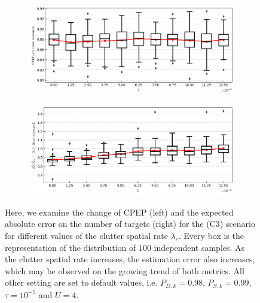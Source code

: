 \begin{figure}
    \centering
    \begin{subfigure}[]{0.48\linewidth}
        \centering
        \includegraphics[width=\linewidth]{figures/c3-clutter-cpep.png}
    \end{subfigure}
    \hfill
    \begin{subfigure}[]{0.48\linewidth}
        \centering
        \includegraphics[width=\linewidth]{figures/c3-clutter-eae.png}
    \end{subfigure}
  \caption[(C3). Change of performance depending on the clutter rate.]{Here, we examine the change of CPEP (left) and the expected absolute error on the number of targets (right) for the (C3) scenario for different values of the clutter spatial rate $\lambda_c$. Every box is the representation of the distribution of $100$ independent samples. As the clutter spatial rate increases, the estimation error also increases, which may be observed on the growing trend of both metrics. All other setting are set to default values, i.e. $P_{D,k} = 0.98$, $P_{S,k} = 0.99$, $\tau = 10^{-5}$ and $U = 4$.}
  \label{fig:c3-clutter}
\end{figure}

